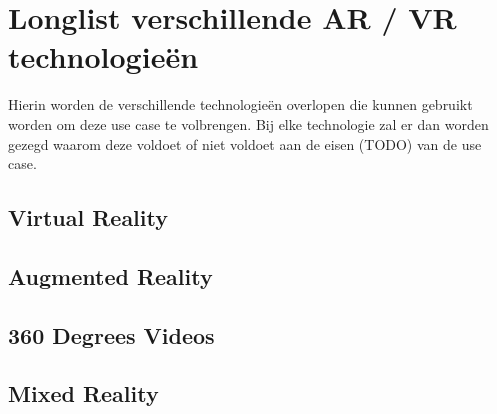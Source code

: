 \chapter{Longlist verschillende AR / VR technologieën}
\label{ch:longlist}

Hierin worden de verschillende technologieën overlopen die kunnen gebruikt worden om deze use case te volbrengen.
Bij elke technologie zal er dan worden gezegd waarom deze voldoet of niet voldoet aan de eisen (TODO) van de use case.

\section{Virtual Reality}
\section{Augmented Reality}
\section{360 Degrees Videos}
\section{Mixed Reality}